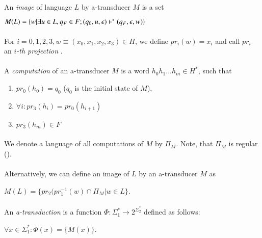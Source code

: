 \paragraph{}
 An \emph{image} of language $L$ by a-transducer $M$ is a set \\
\centerline{$M(L) = \{ w|\exists u \in L, q_{F} \in F; (q_{0}, u, \epsilon) \vdash^\ast (q_{F}, \epsilon, w) \} $}

\paragraph{}
 For $i=0,1,2,3, w \equiv (x_{0},x_{1},x_{2},x_{3}) \in H$, we define $pr_{i}(w) = x_{i}$ and call $pr_{i}$ an \emph{$i$-th projection} .

\paragraph{}
 A \emph{computation} of an a-transducer $M$ is a word $h_{0}h_{1}...h_{m} \in H^{*}$, such that
\begin{enumerate}
\item $pr_{0}(h_{0}) = q_{0}$ ($q_{0}$ is the initial state of $M$),
\item $\forall i: pr_{3}(h_{i}) = pr_{0}(h_{i+1})$
\item $pr_{3}(h_{m}) \in F$
\end{enumerate}

\paragraph{}
\oznacenie We denote a language of all computations of $M$ by $\Pi_{M}$. Note, that $\Pi_{M}$ is regular (\cite{gin:AATPFL}).

\paragraph{}
 Alternatively, we can define an image of $L$ by an a-transducer $M$ as \\
\centerline{$M(L) = \{ pr_{2}(pr_{1}^{-1}(w) \cap \Pi_{M} | w \in L \}$.}

\paragraph{}
 An \emph{a-transduction} is a function $\Phi : \Sigma_{1}^{*} \rightarrow 2^{\Sigma_{2}^{*}}$ defined as follows: \\
\centerline{$\forall x \in \Sigma_{1}^{*}: \Phi(x) = \{ M(x) \} $.}

